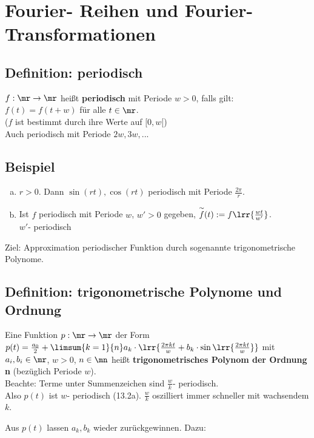 \chapter{Fourier- Reihen und Fourier- Transformationen}

\section{Definition: periodisch}
	$ f:\mr\rightarrow\mr $ heißt \textbf{periodisch} mit Periode $ w>0 $, falls gilt:\\
	$ f(t)=f(t+w) $ für alle $ t\in\mr $.\\
	($ f $ ist bestimmt durch ihre Werte auf $ [0,w[ $)\\
	Auch periodisch mit Periode $ 2w,3w,... $

\section{Beispiel}
	\begin{enumerate}[a)]
	\item $ r>0 $. Dann $ \sin(rt),\cos(rt) $ periodisch mit Periode $ \frac{2\pi}{r} $.
	\item Ist $ f $ periodisch mit Periode $ w $, $ w'>0 $ gegeben, $ \overset{\sim}{f}(t):=f\lrr{\frac{wt}{w'}} $.\\
	$ w' $- periodisch
	\end{enumerate}
	
	Ziel: Approximation periodischer Funktion durch sogenannte trigonometrische Polynome.
	
\section{Definition: trigonometrische Polynome und Ordnung}
	Eine Funktion $ p:\mr\rightarrow\mr $ der Form $ p(t)=\frac{a_0}{2}+\limsum{k=1}{n}a_k\cdot\lrr{\frac{2\pi kt}{w}+b_k\cdot\sin\lrr{\frac{2\pi kt}{w}}} $ mit $ a_i,b_i\in\mr $, $ w>0 $, $ n\in\mn $ heißt \textbf{trigonometrisches Polynom der Ordnung n} (bezüglich Periode $ w $).\\
	Beachte: Terme unter Summenzeichen sind $ \frac{w}{k} $- periodisch.\\
	Also $ p(t) $ ist $ w $- periodisch (13.2a).
	$ \frac{w}{k} $ oszilliert immer schneller mit wachsendem $ k $.
	
	Aus $ p(t) $ lassen $ a_k,b_k $ wieder zurückgewinnen. Dazu:

